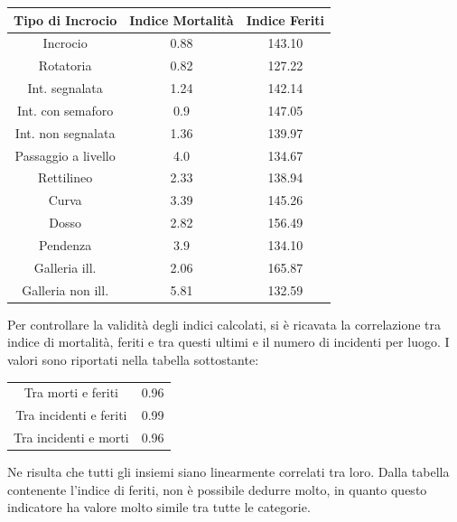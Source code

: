 \documentclass[a4paper]{report}
\begin{document}
\begin{center}
    \def\arraystretch{1.5}%
    \begin{tabular}{ |c|c|c| } 
    \hline
    Tipo di Incrocio & Indice Mortalità & Indice Feriti \\ 
    \hline
    \rowcolor{TableGray}
    Incrocio                & 0.88 & 143.10 \\
    Rotatoria               & 0.82 & 127.22 \\
    \rowcolor{TableGray}
    Int. segnalata          & 1.24 & 142.14 \\
    Int. con semaforo       & 0.9 & 147.05 \\
    \rowcolor{TableGray}
    Int. non segnalata      & 1.36 & 139.97\\
    Passaggio a livello     & 4.0 & 134.67\\
    \rowcolor{TableGray}
    Rettilineo              & 2.33 & 138.94\\
    Curva                   & 3.39 & 145.26\\
    \rowcolor{TableGray}
    Dosso                   & 2.82 & 156.49\\
    Pendenza                & 3.9 & 134.10\\
    \rowcolor{TableGray}
    Galleria ill.           & 2.06 & 165.87\\
    Galleria non ill.       & 5.81 & 132.59\\
    \hline
    \end{tabular}
\end{center}

Per controllare la validità degli indici calcolati, si è ricavata la correlazione 
tra indice di mortalità, feriti e tra questi ultimi e il numero di incidenti per 
luogo. 
I valori sono riportati nella tabella sottostante: 

\begin{center}
    \def\arraystretch{1.5}%
    \begin{tabular}{ |c|c| }
        \hline
        \rowcolor{TableGray}
        Tra morti e feriti      & 0.96 \\ 
        Tra incidenti e feriti  & 0.99 \\
        \rowcolor{TableGray}
        Tra incidenti e morti   & 0.96 \\
        \hline
    \end{tabular}
\end{center}

Ne risulta che tutti gli insiemi siano linearmente correlati tra loro. 
Dalla tabella contenente l'indice di feriti, non è possibile dedurre molto, 
in quanto questo indicatore ha valore molto simile tra tutte le categorie. 
\end{document}
